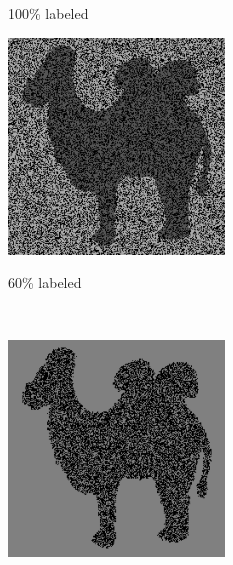 \documentclass{article}
\begin{document}
\begin{figure}[htb]
\begin{minipage}[b]{.30\linewidth}
      \centerline{100\% labeled }\medskip
    \end{minipage}
    \hfill
    \begin{minipage}[b]{0.30\linewidth}
      \centering
      \centerline{\includegraphics[width=\textwidth,cfbox=black 1pt 0pt]{ress/camel40/camel40_miss.png}}
      \centerline{60\% labeled }\medskip
    \end{minipage}
    \\
    \begin{minipage}[b]{0.30\linewidth}
        \centering
        \centerline{\includegraphics[width=\textwidth,cfbox=black 1pt 0pt]{ress/camel40/camel40_vsl.png}}

\end{minipage}
\end{figure}
\end{document}
